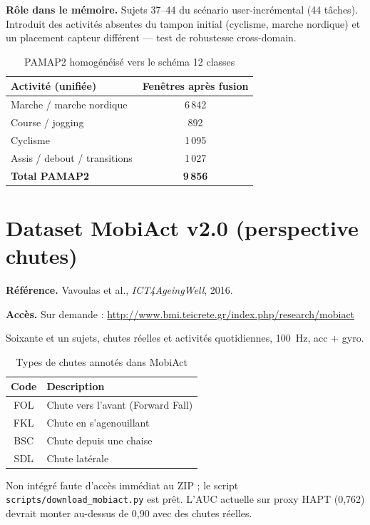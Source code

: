 \documentclass[a4paper,12pt]{report}
\begin{document}
\textbf{Rôle dans le mémoire.} Sujets 37--44 du scénario user-incrémental (44 tâches).
Introduit des activités absentes du tampon initial (cyclisme, marche nordique) et un
placement capteur différent — test de robustesse cross-domain.

\begin{table}[H]
\centering
\small
\begin{tabularx}{\textwidth}{|Y|c|}
\hline
\textbf{Activité (unifiée)} & \textbf{Fenêtres après fusion} \\
\hline
Marche / marche nordique & 6\,842 \\
Course / jogging & 892 \\
Cyclisme & 1\,095 \\
Assis / debout / transitions & 1\,027 \\
\hline
\textbf{Total PAMAP2} & \textbf{9\,856} \\
\hline
\end{tabularx}
\caption{PAMAP2 homogénéisé vers le schéma 12 classes}
\label{tab:annexe_pamap2}
\end{table}

\section{Dataset MobiAct v2.0 (perspective chutes)}

\textbf{Référence.} Vavoulas et al., \emph{ICT4AgeingWell}, 2016.

\textbf{Accès.} Sur demande :
\url{http://www.bmi.teicrete.gr/index.php/research/mobiact}

Soixante et un sujets, chutes réelles et activités quotidiennes, 100~Hz, acc + gyro.

\begin{table}[H]
\centering
\small
\begin{tabularx}{0.92\textwidth}{|c|Y|}
\hline
\textbf{Code} & \textbf{Description} \\
\hline
FOL & Chute vers l'avant (Forward Fall) \\
FKL & Chute en s'agenouillant \\
BSC & Chute depuis une chaise \\
SDL & Chute latérale \\
\hline
\end{tabularx}
\caption{Types de chutes annotés dans MobiAct}
\label{tab:annexe_mobiact_falls}
\end{table}

Non intégré faute d'accès immédiat au ZIP ; le script
\texttt{scripts/download\_mobiact.py} est prêt. L'AUC actuelle sur proxy HAPT
(0,762) devrait monter au-dessus de 0,90 avec des chutes réelles.
\end{document}
